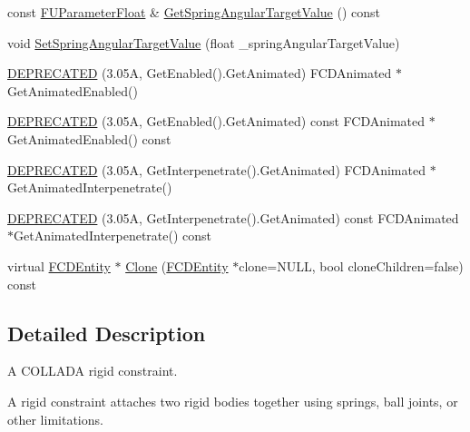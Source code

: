 \begin{DoxyCompactItemize}
\item 
const \hyperlink{classFUParameterT}{FUParameterFloat} \& \hyperlink{classFCDPhysicsRigidConstraint_aace7cc7301f20ba85ad32807a3b2bffd}{GetSpringAngularTargetValue} () const 
\item 
void \hyperlink{classFCDPhysicsRigidConstraint_ab0ab82e451611446b736be4a4656cd80}{SetSpringAngularTargetValue} (float \_\-springAngularTargetValue)
\item 
\hyperlink{classFCDPhysicsRigidConstraint_a72ffcdeb5fb61c9f0891da39bffd168a}{DEPRECATED} (3.05A, GetEnabled().GetAnimated) FCDAnimated $\ast$GetAnimatedEnabled()
\item 
\hyperlink{classFCDPhysicsRigidConstraint_aafc4b3931100ed13df110584b0a72623}{DEPRECATED} (3.05A, GetEnabled().GetAnimated) const FCDAnimated $\ast$GetAnimatedEnabled() const 
\item 
\hyperlink{classFCDPhysicsRigidConstraint_adcb526a3ce0c595eef0744e424cb9d12}{DEPRECATED} (3.05A, GetInterpenetrate().GetAnimated) FCDAnimated $\ast$GetAnimatedInterpenetrate()
\item 
\hyperlink{classFCDPhysicsRigidConstraint_a7b338e0666f3837068ab955687b51aea}{DEPRECATED} (3.05A, GetInterpenetrate().GetAnimated) const FCDAnimated $\ast$GetAnimatedInterpenetrate() const 
\item 
virtual \hyperlink{classFCDEntity}{FCDEntity} $\ast$ \hyperlink{classFCDPhysicsRigidConstraint_a45abae1d5a24c70f830e0a14137cd98e}{Clone} (\hyperlink{classFCDEntity}{FCDEntity} $\ast$clone=NULL, bool cloneChildren=false) const 
\end{DoxyCompactItemize}


\subsection{Detailed Description}
A COLLADA rigid constraint.

A rigid constraint attaches two rigid bodies together using springs, ball joints, or other limitations. 


